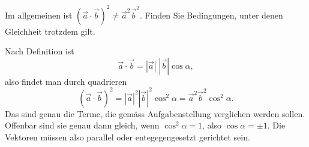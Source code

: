Im allgemeinen ist $(\vec a\cdot \vec b )^2\ne \vec a^2\vec b^2$.
Finden Sie Bedingungen, unter denen Gleichheit trotzdem gilt.


\begin{loesung}
Nach Definition ist
\[
\vec a\cdot\vec b=|\vec a|\;|\vec b|\cos\alpha ,
\]
also findet man durch quadrieren
\[
(\vec a\cdot\vec b)^2
=
|\vec a|^2|\vec b|^2 \cos^2 \alpha
=
\vec a^2\vec b^2 \cos^2 \alpha.
\]
Das sind genau die Terme, die gemäss Aufgabenstellung verglichen werden
sollen. Offenbar sind sie genau dann gleich, wenn $\cos^2\alpha=1$,
also
$\cos\alpha=\pm 1$. Die Vektoren müssen also parallel oder
entegegengesetzt gerichtet sein.
\end{loesung}

